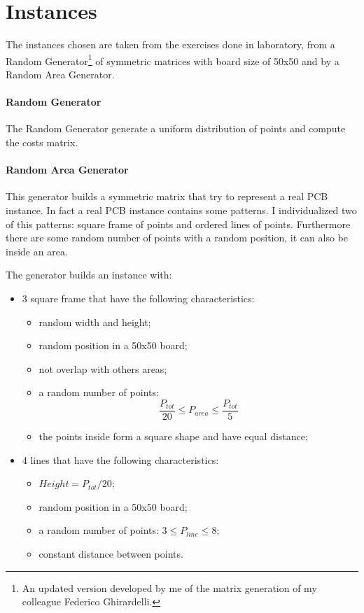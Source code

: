 \section{Instances}
	The instances chosen are taken from the exercises done in laboratory, from a Random Generator\footnote{An updated version developed by me of the matrix generation of my colleague Federico Ghirardelli.} of symmetric matrices with board size of 50x50 and by a Random Area Generator.
	
	\paragraph{Random Generator} The Random Generator generate a uniform distribution of points and compute the costs matrix.
	
	\paragraph{Random Area Generator} This generator builds a symmetric matrix that try to represent a real PCB instance. In fact a real PCB instance contains some patterns. I individualized two of this patterns: square frame of points and ordered lines of points. Furthermore there are some random number of points with a random position, it can also be inside an area. 
	
	The generator builds an instance with:
	\begin{itemize}
		\item 3 square frame that have the following characteristics:
			\begin{itemize}
				\item random width and height;
				\item random position in a 50x50 board;
				\item not overlap with others areas;
				\item a random number of points:
				\begin{equation*}
					\frac{P_{tot}}{20} \leq P_{area} \leq \frac{P_{tot}}{5}  
				\end{equation*}
				\item the points inside form a square shape and have equal distance;
			\end{itemize}
		\item 4 lines that have the following characteristics:
			\begin{itemize}
				\item $Height = P_{tot} / 20$;
				\item random position in a 50x50 board;
				\item a random number of points: $3 \leq P_{line} \leq 8$;
				\item constant distance between points.
			\end{itemize}
	\end{itemize}

